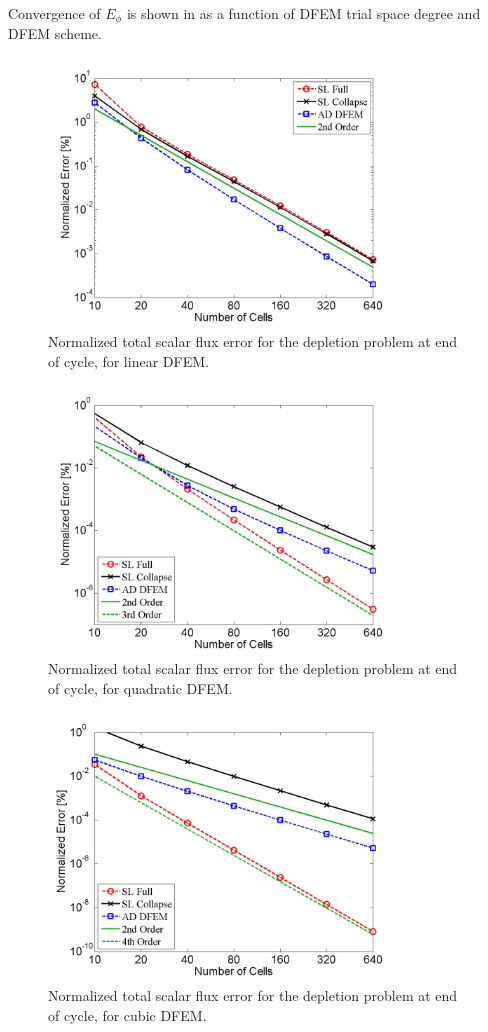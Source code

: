Convergence of $E_{\phi}$ is shown in  as a function of DFEM trial space degree and DFEM scheme.
\begin{figure}[!hbp]
\centering
\includegraphics[width=9.5cm]{chapter5_depletion/Flux_P1_norm_err.png}
\caption{Normalized total scalar flux error for the depletion problem at end of cycle, for linear DFEM.}
\label{fig:depletion_flux_p1}
\end{figure}

\pagebreak

\begin{figure}[!htp]
\centering
\includegraphics[width=9.5cm]{chapter5_depletion/Flux_P2_norm_err.png}
\caption{Normalized total scalar flux error for the depletion problem at end of cycle, for quadratic DFEM.}
\label{fig:depletion_flux_p2}
\end{figure}

\begin{figure}[!hbp]
\centering
\includegraphics[width=9.5cm]{chapter5_depletion/Flux_P3_norm_err.png}
\caption{Normalized total scalar flux error for the depletion problem at end of cycle, for cubic DFEM.}
\label{fig:depletion_flux_p3}
\end{figure}

